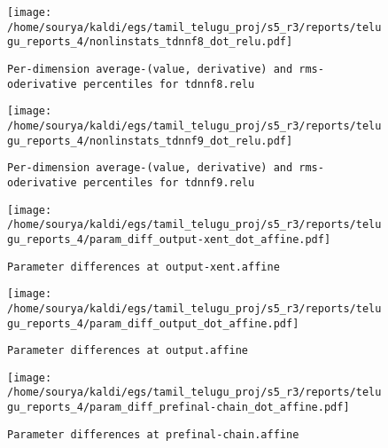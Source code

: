 \documentclass[prl,10pt,twocolumn]{revtex4}
\begin{document}
\newpage
\begin{figure}[h]
  \begin{center}
    \caption{\texttt{Per-dimension average-(value, derivative) and rms-oderivative percentiles for tdnnf8.relu}}
    \texttt{[image: /home/sourya/kaldi/egs/tamil\_telugu\_proj/s5\_r3/reports/telugu\_reports\_4/nonlinstats\_tdnnf8\_dot\_relu.pdf]}
  \end{center}
\end{figure}
\clearpage


\newpage
\begin{figure}[h]
  \begin{center}
    \caption{\texttt{Per-dimension average-(value, derivative) and rms-oderivative percentiles for tdnnf9.relu}}
    \texttt{[image: /home/sourya/kaldi/egs/tamil\_telugu\_proj/s5\_r3/reports/telugu\_reports\_4/nonlinstats\_tdnnf9\_dot\_relu.pdf]}
  \end{center}
\end{figure}
\clearpage


\newpage
\begin{figure}[h]
  \begin{center}
    \caption{\texttt{Parameter differences at output-xent.affine}}
    \texttt{[image: /home/sourya/kaldi/egs/tamil\_telugu\_proj/s5\_r3/reports/telugu\_reports\_4/param\_diff\_output-xent\_dot\_affine.pdf]}
  \end{center}
\end{figure}
\clearpage


\newpage
\begin{figure}[h]
  \begin{center}
    \caption{\texttt{Parameter differences at output.affine}}
    \texttt{[image: /home/sourya/kaldi/egs/tamil\_telugu\_proj/s5\_r3/reports/telugu\_reports\_4/param\_diff\_output\_dot\_affine.pdf]}
  \end{center}
\end{figure}
\clearpage


\newpage
\begin{figure}[h]
  \begin{center}
    \caption{\texttt{Parameter differences at prefinal-chain.affine}}
    \texttt{[image: /home/sourya/kaldi/egs/tamil\_telugu\_proj/s5\_r3/reports/telugu\_reports\_4/param\_diff\_prefinal-chain\_dot\_affine.pdf]}
  \end{center}
\end{figure}
\clearpage
\end{document}
